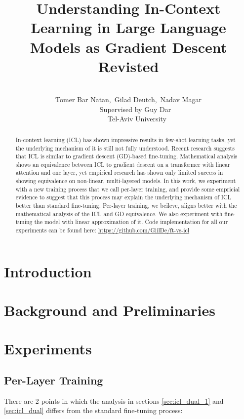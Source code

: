 \documentclass[11pt]{article}
\title{Understanding In-Context Learning in Large Language Models as Gradient Descent Revisted}
\author{\\
Tomer Bar Natan,~Gilad Deutch,~Nadav Magar\\
~~~~Supervised by Guy Dar\\
~~~~~Tel-Aviv University}
\date{}
\begin{document}
\maketitle

\begin{abstract}
	In-context learning (ICL) has shown impressive results in few-shot learning tasks, yet the underlying mechanism of it is still not fully understood.
	Recent research suggests that ICL is similar to gradient descent (GD)-based fine-tuning.
	Mathematical analysis shows an equivalence between ICL to gradient descent on a transformer with linear attention and one layer,
	yet empirical research has shown only limited success in showing equivalence on non-linear, multi-layered models.
	In this work, we experiment with a new training process that we call per-layer training,
	and provide some empricial evidence to suggest that this process may explain the underlying mechanism of ICL better than standard fine-tuning.
	Per-layer training, we beileve, aligns better with the mathematical analysis of the ICL and GD equivalence.
	We also experiment with fine-tuning the model with linear approximation of it.
	Code implementation for all our experiments can be found here:
	\href{https://github.com/GiilDe/ft-vs-icl}{https://github.com/GiilDe/ft-vs-icl}
\end{abstract}

\section{Introduction}


\section{Background and Preliminaries}



\section{Experiments}
\subsection{Per-Layer Training}
There are 2 points in which the analysis in sections \ref{sec:icl_dual_1} and \ref{sec:icl_dual} differs from the standard fine-tuning process:
\end{document}
